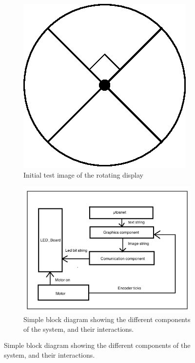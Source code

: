 \documentclass[a4paper,10pt]{article}
\begin{document}
	\begin{figure}[h!]
		\begin{subfigure}[b]{.38\linewidth}
			\centering
			\includegraphics[width=\linewidth]{images/circle}
			\caption{Initial test image of the rotating display}
			\label{fig:circle}	
		\end{subfigure}
		\begin{subfigure}[b]{.58\linewidth}
			\centering
			\includegraphics[width=\linewidth]{images/init_model}
			\caption{Simple block diagram showing the different components of the system, and their interactions.}
			\label{fig:initmodel}	
		\end{subfigure}		
	\end{figure}
	
\end{document}
